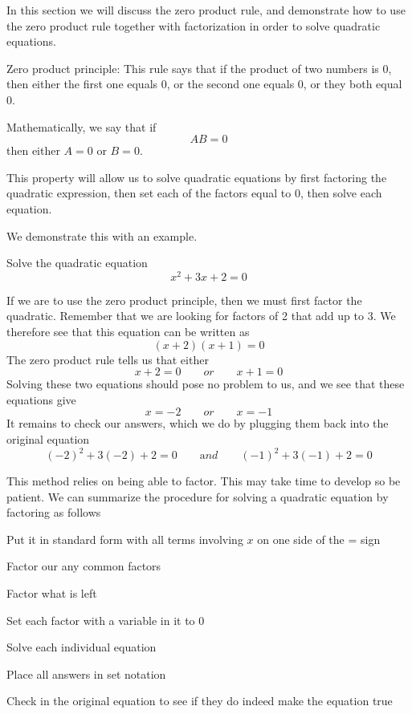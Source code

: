 In this section we will discuss the zero product rule, and demonstrate how to use the zero product rule together
with factorization in order to \gls{solve} quadratic equations. 

\begin{myDefinition}\label{sec:zeroprodprin}
	{Zero product principle}: 
	This rule says that if the product of two numbers is 0, then either the first one equals 0, or the second one
	equals 0, or they both equal 0. 
				
	Mathematically, we say that if
	\[
		AB=0
	\]
	then either $A=0$ or $B=0$.
\end{myDefinition}

This property will allow us to solve quadratic equations by first factoring the quadratic expression, then set
each of the factors equal to 0, then solve each equation.

We demonstrate this with an example.

\begin{myexample}
Solve the quadratic equation
\[
	x^2+3x+2=0
\]
\end{myexample}
\begin{myProof}
	If we are to use the zero product principle, then we must first factor the quadratic. Remember that we 
	are looking for factors of 2 that add up to 3. We therefore see that this equation can be written as
	\[
		(x+2)(x+1)=0
	\]
	The zero product rule tells us that either
	\[
		x+2=0\qquad or \qquad x+1 = 0
	\]
	Solving these two equations should pose no problem to us, and we see that these equations give
	\[
		x=-2 \qquad or \qquad x=-1
	\]
	It remains to check our answers, which we do by plugging them back into the original equation
	\[
		(-2)^2 + 3(-2)+2 = 0 \qquad {\mathrm and}\qquad (-1)^2+3(-1)+2=0
	\]
	{}
\end{myProof} 

This method relies on being able to factor. This may take time to develop so be patient. We can
summarize the procedure for solving a quadratic equation by factoring as follows
\begin{steps}
	\item Put it in standard form with all terms involving $x$ on one side of the = sign
	\item Factor our any common factors
	\item Factor what is left
	\item Set each factor with a \gls{variable} in it to 0
	\item Solve each individual equation
	\item Place all answers in set notation
	\item Check in the original equation to see if they do indeed make the equation true
\end{steps} 

